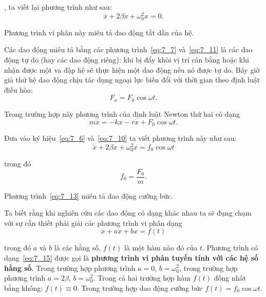 , ta viết lại phương trình  như sau:
\begin{equation}\label{eq:7_11}
	\ddot{x} + 2\beta\dot{x} + \omega_0^2 x = 0.
\end{equation}

\noindent
Phương trình vi phân này miêu tả dao động tắt dần của hệ.

Các dao động miêu tả bằng các phương trình~\eqref{eq:7_7} và~\eqref{eq:7_11} là các dao động tự do (hay các dao động riêng): khi bị đẩy khỏi vị trí cân bằng hoặc khi nhận được một va đập hệ sẽ thực hiện một dao động nếu nó được tự do. Bây giờ giả thử hệ dao động chịu tác dụng ngoại lực biến đổi với thời gian theo định luật điều hòa:
\begin{equation}\label{eq:7_12}
	F_x = F_0 \cos\omega t.
\end{equation}

\noindent
Trong trường hợp này phương trình của định luật Newton thứ hai có dạng
\begin{equation*}
	m\ddot{x} = -kx - r\dot{x} + F_0 \cos\omega t.
\end{equation*}

\noindent
Đưa vào ký hiệu~\eqref{eq:7_6} và~\eqref{eq:7_10} ta viết phương trình này như sau:
\begin{equation}\label{eq:7_13}
	\ddot{x} + 2\beta\dot{x} +\omega_0^2 x = f_0 \cos\omega t
\end{equation}

\noindent
trong đó
\begin{equation}\label{eq:7_14}
	f_0 = \frac{F_0}{m}.
\end{equation}

\noindent
Phương trình~\eqref{eq:7_13} miêu tả dao động cưỡng bức.

Ta biết rằng khi nghiên cứu các dao động có dạng khác nhau ta sẽ đụng chạm với sự cần thiết phải giải các phương trình vi phân dạng
\begin{equation}\label{eq:7_15}
	\ddot{x} + a\dot{x} +bx = f(t)
\end{equation}

\noindent
trong đó $a$ và $b$ là các hằng số, $f(t)$ là một hàm nào đó của $t$. Phương trình có dạng~\eqref{eq:7_15} được gọi là \textbf{phương trình vi phân tuyến tính với các hệ số hằng số}. Trong trường hợp phương trình  $a=0$, $b=\omega_0^2$, trong trường hợp phương trình  $a=2\beta$, $b=\omega_0^2$. Trong cả hai trường hợp hàm $f(t)$ đồng nhất bằng không: $f(t)\equiv 0$. Trong trường hợp dao động cưỡng bức $f(t)=f_0\cos\omega t$.

